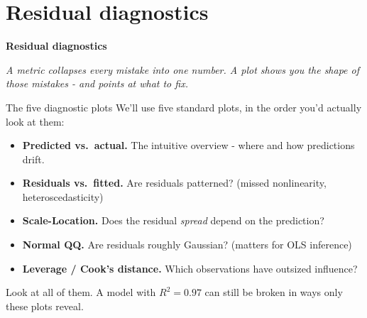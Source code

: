 \documentclass[aspectratio=169]{beamer}
\newcommand{\sectiontransition}[2]{%
  \begin{frame}[plain]
    \centering
    \vfill
    {\color{armblue}\Large\textbf{#1}}\\[14pt]
    \begin{minipage}{0.78\textwidth}\centering\itshape #2\end{minipage}
    \vfill
  \end{frame}%
}
\begin{document}
\section{Residual diagnostics}
\sectiontransition{Residual diagnostics}{A metric collapses every mistake into one number. A plot shows you the \emph{shape} of those mistakes - and points at what to fix.}

\begin{frame}{The five diagnostic plots}
  We'll use five standard plots, in the order you'd actually look at them:
  \vfill
  \begin{itemize}
    \item \textbf{Predicted vs.\ actual.} The intuitive overview - where and how predictions drift.
    \item \textbf{Residuals vs.\ fitted.} Are residuals patterned? (missed nonlinearity, heteroscedasticity)
    \item \textbf{Scale-Location.} Does the residual \emph{spread} depend on the prediction?
    \item \textbf{Normal QQ.} Are residuals roughly Gaussian? (matters for OLS inference)
    \item \textbf{Leverage / Cook's distance.} Which observations have outsized influence?
  \end{itemize}
  \vfill
  Look at all of them. A model with $R^2 = 0.97$ can still be broken in ways only these plots reveal.
\end{frame}
\end{document}
